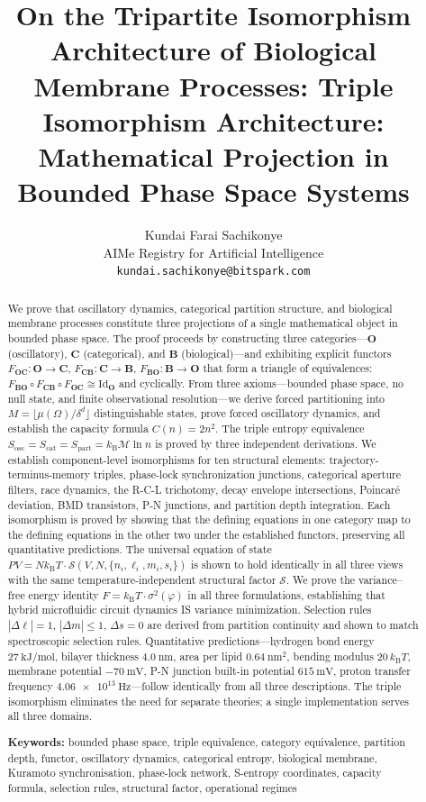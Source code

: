 \documentclass[twocolumn,10pt]{article}
\title{\textbf{On the Tripartite Isomorphism Architecture of Biological Membrane Processes: Triple Isomorphism Architecture: \\Mathematical Projection in Bounded Phase Space Systems}}
\author{
Kundai Farai Sachikonye\\
AIMe Registry for Artificial Intelligence\\
\texttt{kundai.sachikonye@bitspark.com}
}
\date{}
\theoremstyle{remark}
\newcommand{\kB}{k_{\mathrm{B}}}
\newcommand{\Depth}{\mathcal{M}}
\newcommand{\CatO}{\mathbf{O}}
\newcommand{\CatC}{\mathbf{C}}
\newcommand{\CatB}{\mathbf{B}}
\newcommand{\Foc}{F_{\CatO\CatC}}
\newcommand{\Fcb}{F_{\CatC\CatB}}
\newcommand{\Fbo}{F_{\CatB\CatO}}
\newcommand{\IdO}{\mathrm{Id}_{\CatO}}
\begin{document}
\maketitle

\begin{abstract}
\noindent We prove that oscillatory dynamics, categorical partition structure, and biological membrane processes constitute three projections of a single mathematical object in bounded phase space.
The proof proceeds by constructing three categories---$\CatO$ (oscillatory), $\CatC$ (categorical), and $\CatB$ (biological)---and exhibiting explicit functors $\Foc: \CatO \to \CatC$, $\Fcb: \CatC \to \CatB$, $\Fbo: \CatB \to \CatO$ that form a triangle of equivalences: $\Fbo \circ \Fcb \circ \Foc \cong \IdO$ and cyclically.
From three axioms---bounded phase space, no null state, and finite observational resolution---we derive forced partitioning into $M = \lfloor \mu(\Omega)/\delta^d \rfloor$ distinguishable states, prove forced oscillatory dynamics, and establish the capacity formula $C(n) = 2n^2$.
The triple entropy equivalence $S_{\mathrm{osc}} = S_{\mathrm{cat}} = S_{\mathrm{part}} = \kB \Depth \ln n$ is proved by three independent derivations.
We establish component-level isomorphisms for ten structural elements: trajectory-terminus-memory triples, phase-lock synchronization junctions, categorical aperture filters, race dynamics, the R-C-L trichotomy, decay envelope intersections, Poincar\'{e} deviation, BMD transistors, P-N junctions, and partition depth integration.
Each isomorphism is proved by showing that the defining equations in one category map to the defining equations in the other two under the established functors, preserving all quantitative predictions.
The universal equation of state $PV = N\kB T \cdot \mathcal{S}(V,N,\{n_i,\ell_i,m_i,s_i\})$ is shown to hold identically in all three views with the same temperature-independent structural factor $\mathcal{S}$.
We prove the variance--free energy identity $F = \kB T \cdot \sigma^2(\varphi)$ in all three formulations, establishing that hybrid microfluidic circuit dynamics IS variance minimization.
Selection rules $|\Delta \ell| = 1$, $|\Delta m| \le 1$, $\Delta s = 0$ are derived from partition continuity and shown to match spectroscopic selection rules.
Quantitative predictions---hydrogen bond energy $\SI{27}{\kilo\joule\per\mole}$, bilayer thickness $\SI{4.0}{\nano\meter}$, area per lipid $\SI{0.64}{\nano\meter\squared}$, bending modulus $20\,\kB T$, membrane potential $\SI{-70}{\milli\volt}$, P-N junction built-in potential $\SI{615}{\milli\volt}$, proton transfer frequency $\SI{4.06e13}{\hertz}$---follow identically from all three descriptions.
The triple isomorphism eliminates the need for separate theories; a single implementation serves all three domains.

\medskip
\noindent\textbf{Keywords:} bounded phase space, triple equivalence, category equivalence, partition depth, functor, oscillatory dynamics, categorical entropy, biological membrane, Kuramoto synchronisation, phase-lock network, S-entropy coordinates, capacity formula, selection rules, structural factor, operational regimes

\end{abstract}
\end{document}
